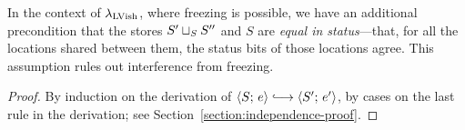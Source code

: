 In the context of $\lambda_{\textrm{LVish}}$, where freezing is possible, we have
an additional precondition that the stores $S' \sqcup_{S} S''$ and
$S$ are \emph{equal in status}---that, for all the locations shared
between them, the status bits of those locations agree.  This
assumption rules out interference from freezing.

\DefEqualStatus

\LemIndependence
\begin{proof}
   By induction on the derivation of $\config{S}{e} \parstepsto
   \config{S'}{e'}$, by cases on the last rule in the derivation; see
   Section~\ref{section:independence-proof}.
\end{proof}
 
